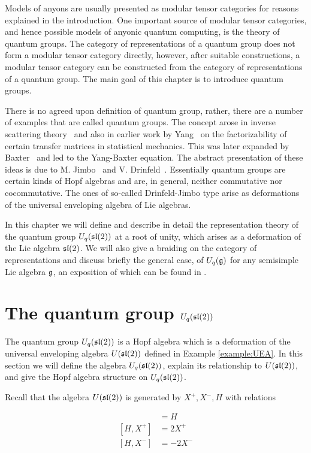 Models of anyons are usually presented as modular
tensor categories for reasons explained in the introduction.  One important
source
of modular tensor categories, and hence possible models of anyonic quantum
computing, is the theory of quantum groups.  The category of representations of a quantum
group does not form a modular tensor category directly, however, after suitable
constructions, a modular tensor category can be constructed from the category
of representations of a quantum group.  The main goal of this chapter is to
introduce quantum groups.

There is no agreed upon definition of quantum group, rather, there are a
number of examples that are called quantum groups.  The concept arose in
inverse scattering theory~\cite{Faddeev79} and also in earlier work by
Yang~\cite{Yang67} on the factorizability of certain transfer matrices in
statistical mechanics.  This was later expanded by Baxter~\cite{Baxter82}
and led to the Yang-Baxter equation.  The abstract presentation of these
ideas is due to M. Jimbo~\cite{Jimbo85} and V. Drinfeld~\cite{Drinfeld86}.
Essentially quantum groups are certain kinds of Hopf algebras and are, in
general, neither commutative nor cocommutative.  The ones of so-called
Drinfeld-Jimbo type arise as deformations of the universal enveloping
algebra of Lie algebras.

In this chapter we will define and describe in detail the representation theory
of the quantum group $U_q(\mathfrak{sl}(2))$ at a root of unity, which arises as a
deformation of the Lie algebra $\mathfrak{sl}(2)$. We will also give a braiding on the
category of representations and discuss briefly the general case, of
$U_q(\mathfrak{g})$ for any semisimple Lie algebra $\mathfrak{g}$, an exposition of which
can be found in \cite{CP}.

\section{The quantum group $U_q(\mathfrak{sl}(2))$}
\label{UqSL2}


The quantum group $U_q(\mathfrak{sl}(2))$ is a Hopf algebra which is a deformation of the
universal enveloping algebra $U(\mathfrak{sl}(2))$ defined in Example \ref{example:UEA}.  In this
section we will define the algebra $U_q(\mathfrak{sl}(2))$, explain its relationship to 
$U(\mathfrak{sl}(2))$, and give the Hopf algebra structure on $U_q(\mathfrak{sl}(2))$.

Recall that the algebra $U(\mathfrak{sl}(2))$ is generated by $X^+,X^-,H$ with relations

\begin{align}
[X^+,X^-] & = H \\ 
[H,X^+] &= 2X^+ \\
[H,X^-] &= -2X^- 
\end{align}

